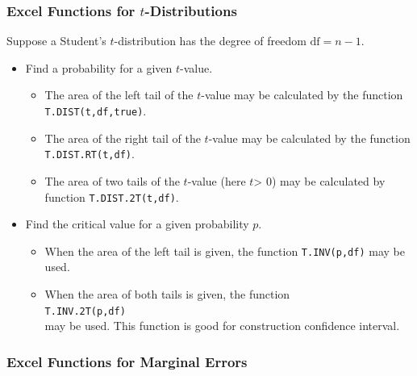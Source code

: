 \subsubsection{Excel Functions for
\(t\)-Distributions}

Suppose a Student's \(t\)-distribution has the degree of freedom
\(\text{df}=n-1\).

\begin{itemize}
\item
  Find a probability for a given \(t\)-value.

  \begin{itemize}
  \item
    The area of the left tail of the \(t\)-value may be calculated by
    the function \texttt{T.DIST(t,df,true)}.
  \item
    The area of the right tail of the \(t\)-value may be calculated by
    the function \texttt{T.DIST.RT(t,df)}.
  \item
    The area of two tails of the \(t\)-value (here \(t\)> 0)
    may be calculated by function \texttt{T.DIST.2T(t,df)}.
  \end{itemize}
\item
  Find the critical value for a given probability \(p\).

  \begin{itemize}
  \item
    When the area of the left tail is given, the function
    \texttt{T.INV(p,df)} may be used.
  \item
    When the area of both tails is given, the function\\
    \texttt{T.INV.2T(p,df)}\\
    may be used. This function is good for
    construction confidence interval.
  \end{itemize}
\end{itemize}

\hypertarget{excel-functions-for-marginal-errors}{%
\subsubsection{Excel Functions for Marginal
Errors}\label{excel-functions-for-marginal-errors}}

